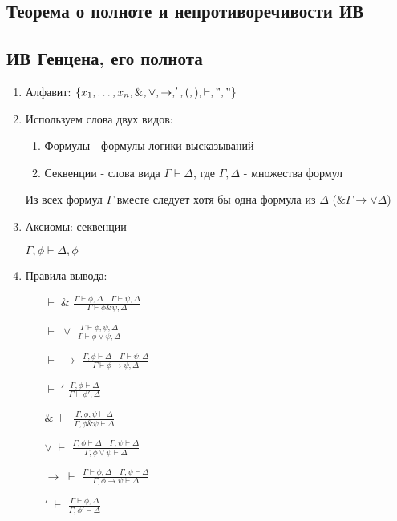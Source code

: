 \documentclass[a4paper]{article}
\theoremstyle{definition}
\theoremstyle{remark}
\begin{document}
    \subsection{Теорема о полноте и непротиворечивости ИВ}
    \subsection{ИВ Генцена, его полнота}
    \begin{enumerate}
        \item Алфавит: $\{ x_1,\dots, x_n, \&, \vee, \to, ', (, ), \vdash, "," \} $
        \item Используем слова двух видов:
            \begin{enumerate}
                \item Формулы - формулы логики высказываний
                \item Секвенции - слова вида $\Gamma\vdash \Delta$, где $\Gamma, \Delta$ - множества формул
            \end{enumerate}
            Из всех формул $\Gamma$ вместе следует хотя бы одна формула из $\Delta$ ($\&\Gamma \to \vee\Delta$)
        \item Аксиомы: секвенции
        
        $\Gamma, \phi \vdash \Delta, \phi$
        \item Правила вывода:
        \begin{itemize}
            \item[$\vdash\;\&$] $\frac{\Gamma \vdash \phi, \Delta \quad \Gamma \vdash \psi, \Delta}{\Gamma \vdash \phi\&\psi, \Delta}$
            \item[$\vdash\;\vee$] $\frac{\Gamma \vdash \phi, \psi, \Delta}{\Gamma \vdash \phi\vee\psi, \Delta}$
            \item[$\vdash\;\to$] $\frac{\Gamma , \phi \vdash  \Delta \quad \Gamma \vdash \psi, \Delta}{\Gamma \vdash \phi\to\psi, \Delta}$
            \item[$\vdash\;'$] $\frac{\Gamma, \phi\vdash\Delta}{\Gamma \vdash \phi', \Delta}$
            \item[$\&\;\vdash$] $\frac{\Gamma, \phi, \psi \vdash\Delta}{\Gamma, \phi\&\psi \vdash\Delta}$
            \item[$\vee\;\vdash$] $\frac{\Gamma , \phi \vdash  \Delta \quad \Gamma, \psi \vdash  \Delta}{\Gamma,\phi\vee\psi \vdash  \Delta}$
            \item[$\to\;\vdash$] $\frac{\Gamma \vdash\phi ,  \Delta \quad \Gamma, \psi \vdash  \Delta}{\Gamma,\phi\to\psi \vdash  \Delta}$
            \item[$'\;\vdash$] $\frac{\Gamma \vdash\phi ,  \Delta }{\Gamma,\phi' \vdash  \Delta}$
        \end{itemize}
    \end{enumerate}
\end{document}

